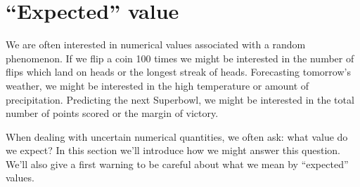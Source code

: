 \documentclass[
  letterpaper,
  DIV=11,
  numbers=noendperiod]{scrreprt}
\theoremstyle{plain}
\theoremstyle{definition}
\theoremstyle{definition}
\theoremstyle{definition}
\theoremstyle{remark}
\begin{document}
\section{``Expected'' value}\label{sec-literacy-ev}

We are often interested in numerical values associated with a random
phenomenon. If we flip a coin 100 times we might be interested in the
number of flips which land on heads or the longest streak of heads.
Forecasting tomorrow's weather, we might be interested in the high
temperature or amount of precipitation. Predicting the next Superbowl,
we might be interested in the total number of points scored or the
margin of victory.

When dealing with uncertain numerical quantities, we often ask: what
value do we expect? In this section we'll introduce how we might answer
this question. We'll also give a first warning to be careful about what
we mean by ``expected'' values.
\end{document}
